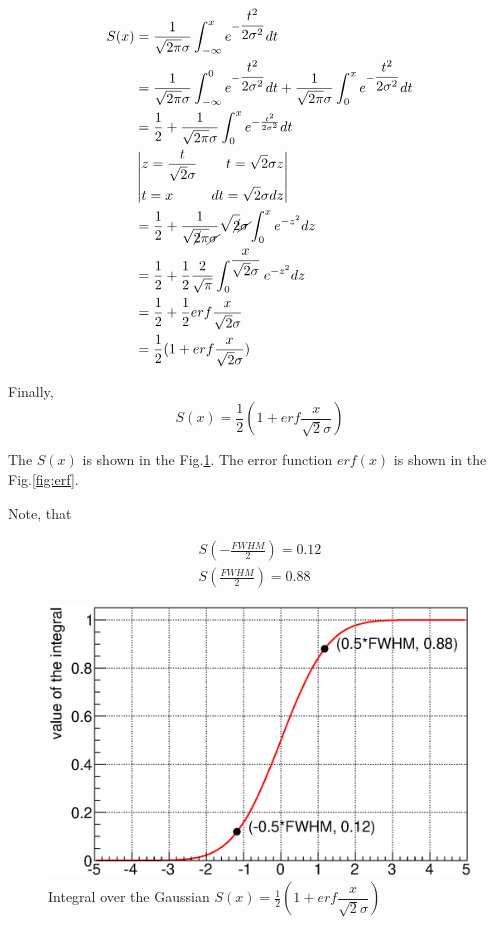 \documentclass[english]{article}
\makeatletter
\def\ScaleIfNeeded{%
\ifdim\Gin@nat@width>\linewidth
\linewidth
\else
\Gin@nat@width
\fi
}
\makeatother
\begin{document}
\begin{align*}
S(x) &= \frac{1}{\sqrt{2\pi}\sigma} \int_{-\infty}^x e^{-\dfrac{t^2}{2\sigma^2}} dt \\
  &= \frac{1}{\sqrt{2\pi}\sigma} \int_{-\infty}^0 e^{-\dfrac{t^2}{2\sigma^2}} dt + 
     \frac{1}{\sqrt{2\pi}\sigma} \int_{0}^x e^{-\dfrac{t^2}{2\sigma^2}} dt \\
  &= \frac{1}{2} + \frac{1}{\sqrt{2\pi}\sigma} \int_{0}^x e^{-\frac{t^2}{2\sigma^2}} dt \\
  & \left\lvert
  \begin{aligned}
  & z = \frac{t}{\sqrt{2}\sigma} & t = \sqrt{2}\sigma z \\
  & t = x                        & dt = \sqrt{2}\sigma dz
  \end{aligned}
  \right\rvert \\
  &= \frac{1}{2} + \frac{1}{\sqrt{\cancel{2}\pi}\cancel{\sigma}} \sqrt{\cancel{2}}\cancel{\sigma} \int_{0}^x e^{-z^2} dz \\
  &= \frac{1}{2} + \frac{1}{2} \frac{2}{\sqrt{\pi}} \int_{0}^{\dfrac{x}{\sqrt{2}\sigma}} e^{-z^2} dz \\
  &= \frac{1}{2} + \frac{1}{2} erf\dfrac{x}{\sqrt{2}\sigma} \\
  &= \frac{1}{2}(1 + erf\dfrac{x}{\sqrt{2}\sigma})
\end{align*}

Finally, 
\[
S(x) = \frac{1}{2}(1 + erf\dfrac{x}{\sqrt{2}\sigma})
\]

The $S(x)$ is shown in the Fig.\ref{fig:fint_gaus}.
The error function $erf(x)$ is shown in the Fig.\ref{fig:erf}. 

Note, that 

\begin{align*}
S(-\frac{FWHM}{2}) = 0.12 \\
S(\frac{FWHM}{2}) = 0.88
\end{align*}

\begin{figure}[h]
\centering
\begin{minipage}[t]{1.0 \linewidth}
\includegraphics[width=\ScaleIfNeeded]{fint_gaus.eps}
\caption{Integral over the Gaussian $S(x) = \frac{1}{2}(1 + erf\dfrac{x}{\sqrt{2}\sigma})$}
\label{fig:fint_gaus}
\end{minipage}
\end{figure}
\end{document}
